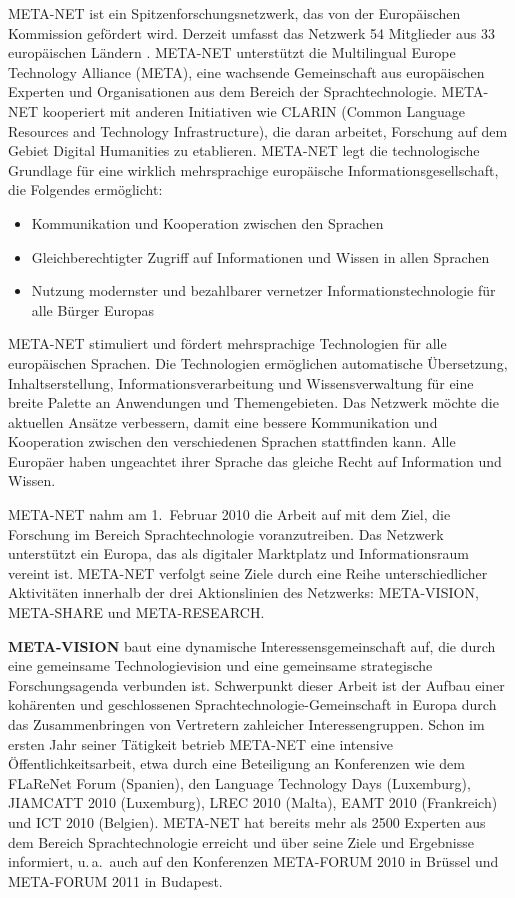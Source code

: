 \documentclass[]{../../metanetpaper}
\begin{document}
\begin{multicols}{2}

META-NET ist ein Spitzenforschungsnetzwerk, das von der Europäischen Kommission gefördert wird. Derzeit umfasst das Netzwerk 54 Mitglieder aus 33 europäischen Ländern \cite{rehm2011}. META-NET unterstützt die Multilingual Europe Technology Alliance (META), eine wachsende Gemeinschaft aus europäischen Experten und Organisationen aus dem Bereich der Sprachtechnologie. META-NET kooperiert mit anderen Initiativen wie CLARIN (Common Language Resources and Technology Infrastructure), die daran arbeitet, Forschung auf dem Gebiet Digital Humanities zu etablieren. META-NET legt die technologische Grundlage für eine wirklich mehrsprachige europäische Informationsgesellschaft, die Folgendes ermöglicht:

\begin{itemize}
\item Kommunikation und Kooperation zwischen den Sprachen
\item Gleichberechtigter Zugriff auf Informationen und Wissen in allen Sprachen
\item Nutzung modernster und bezahlbarer vernetzer Informationstechnologie für alle Bürger Europas
\end{itemize}

META-NET stimuliert und fördert mehrsprachige Technologien für alle europäischen Sprachen. Die Technologien ermöglichen automatische Übersetzung, Inhaltserstellung, Informationsverarbeitung und Wissensverwaltung für eine breite Palette an Anwendungen und Themengebieten. Das Netzwerk möchte die aktuellen Ansätze verbessern, damit eine bessere Kommunikation und Kooperation zwischen den verschiedenen Sprachen stattfinden kann. Alle Europäer haben ungeachtet ihrer Sprache das gleiche Recht auf Information und Wissen.

META-NET nahm am 1.~Februar 2010 die Arbeit auf mit dem Ziel, die Forschung im Bereich Sprachtechnologie voranzutreiben. Das Netzwerk unterstützt ein Europa, das als digitaler Marktplatz und Informationsraum vereint ist. META-NET verfolgt seine Ziele durch eine Reihe unterschiedlicher Aktivitäten innerhalb der drei Aktionslinien des Netzwerks: META-VISION, META-SHARE und META-RESEARCH. 

\textbf{META-VISION} baut eine dynamische Interessensgemeinschaft auf, die durch eine gemeinsame Technologievision und eine gemeinsame strategische For\-schungs\-a\-gen\-da verbunden ist. Schwerpunkt dieser Arbeit ist der Aufbau einer kohärenten und geschlossenen Sprach\-tech\-no\-lo\-gie-Ge\-mein\-schaft in Europa durch das Zusammenbringen von Vertretern zahleicher Interessengruppen. Schon im ersten Jahr seiner Tätigkeit betrieb META-NET eine intensive Öffentlichkeitsarbeit, etwa durch eine Beteiligung an Konferenzen wie dem FLaReNet Forum (Spanien), den Language Technology Days (Luxemburg), JIAMCATT 2010 (Luxemburg), LREC 2010 (Malta), EAMT 2010 (Frankreich) und ICT 2010 (Belgien). META-NET hat bereits mehr als 2500 Experten aus dem Bereich Sprachtechnologie erreicht und über seine Ziele und Ergebnisse informiert, u.\,a.~auch auf den Konferenzen META-FORUM 2010 in Brüssel und META-FORUM 2011 in Budapest.


\end{multicols}
\end{document}
